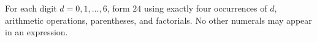 For each digit $d=0,1,\ldots,6$, form $24$ using exactly four occurrences of $d$, arithmetic operations, parentheses, and factorials. No other numerals may appear in an expression.
